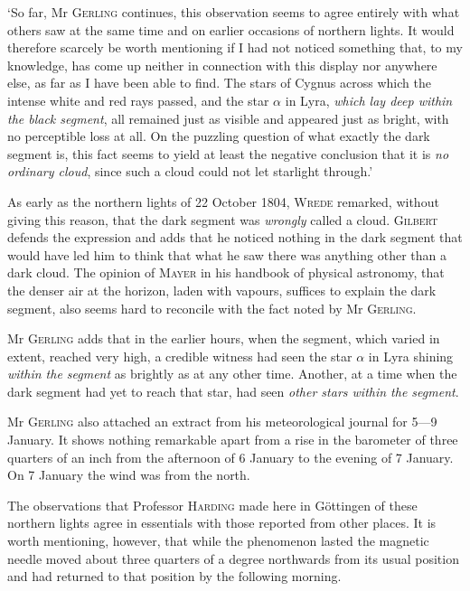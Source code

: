 ‘So far, Mr \textsc{Gerling} continues, this observation seems to agree entirely with what others saw at the same time and on earlier occasions of northern lights. It would therefore scarcely be worth mentioning if I had not noticed something that, to my knowledge, has come up neither in connection with this display nor anywhere else, as far as I have been able to find. The stars of Cygnus across which the intense white and red rays passed, and the star $\alpha$ in Lyra, \textit{which lay deep within the black segment}, all remained just as visible and appeared just as bright, with no perceptible loss at all. On the puzzling question of what exactly the dark segment is, this fact seems to yield at least the negative conclusion that it is \textit{no ordinary cloud}, since such a cloud could not let starlight through.’

As early as the northern lights of 22 October 1804, \textsc{Wrede} remarked, without giving this reason, that the dark segment was \textit{wrongly} called a cloud. \textsc{Gilbert} defends the expression and adds that he noticed nothing in the dark segment that would have led him to think that what he saw there was anything other than a dark cloud. The opinion of \textsc{Mayer} in his handbook of physical astronomy, that the denser air at the horizon, laden with vapours, suffices to explain the dark segment, also seems hard to reconcile with the fact noted by Mr \textsc{Gerling}.

Mr \textsc{Gerling} adds that in the earlier hours, when the segment, which varied in extent, reached very high, a credible witness had seen the star $\alpha$ in Lyra shining \textit{within the segment} as brightly as at any other time. Another, at a time when the dark segment had yet to reach that star, had seen \textit{other stars within the segment}.

Mr \textsc{Gerling} also attached an extract from his meteorological journal for 5—9 January. It shows nothing remarkable apart from a rise in the barometer of three quarters of an inch from the afternoon of 6 January to the evening of 7 January. On 7 January the wind was from the north.

The observations that Professor \textsc{Harding} made here in Göttingen of these northern lights agree in essentials with those reported from other places. It is worth mentioning, however, that while the phenomenon lasted the magnetic needle moved about three quarters of a degree northwards from its usual position and had returned to that position by the following morning.

\bigskip
